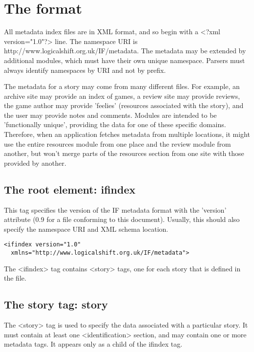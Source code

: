 \documentclass[a4paper,11pt]{article}
\begin{document}
\section{The format}

All metadata index files are in XML format, and so begin with a <?xml version="1.0"?>
line. The namespace URI is http://www.logicalshift.org.uk/IF/metadata. The metadata may
be extended by additional modules, which must have their own unique namespace. Parsers
must always identify namespaces by URI and not by prefix.

The metadata for a story may come from many different files. For example, an archive
site may provide an index of games, a review site may provide reviews, the game author
may provide 'feelies' (resources associated with the story), and the user may
provide notes and comments. Modules are intended to be 'functionally unique', providing
the data for one of these specific domains. Therefore, when an application fetches metadata
from multiple locations, it might use the entire resources module from one place and the
review module from another, but won't merge parts of the resources section from one site
with those provided by another.

\subsection{The root element: ifindex}

This tag specifies the version of the IF metadata format with the 'version' attribute (0.9 for a
file conforming to this document). Usually, this should also specify the namespace URI
and XML schema location.

\begin{example}
  \begin{verbatim}
<ifindex version="1.0"
  xmlns="http://www.logicalshift.org.uk/IF/metadata">
  \end{verbatim}
\end{example}

The <ifindex> tag contains <story> tags, one for each story that is defined in the file.

\subsection{The story tag: story}

The <story> tag is used to specify the data associated with a particular story. It must contain
at least one <identification> section, and may contain one or more metadata tags. It appears
only as a child of the ifindex tag.
\end{document}
